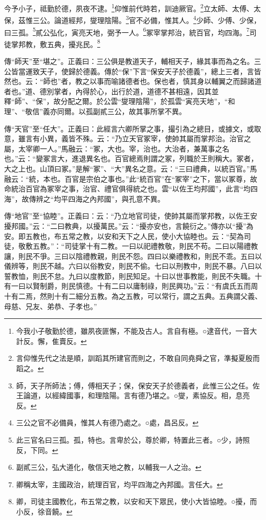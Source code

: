 今予小子，祗勤於德，夙夜不逮。\footnote{今我小子敬勤於德，雖夙夜匪懈，不能及古人。言自有極。○逮音代，一音大計反。懈，隹賣反。}仰惟前代時若，訓迪厥官。\footnote{言仰惟先代之法是順，訓蹈其所建官而則之，不敢自同堯舜之官，準擬夏殷而蹈之。}立太師、太傅、太保，茲惟三公。論道經邦，燮理陰陽。\footnote{師，天子所師法；傅，傅相天子；保，保安天子於德義者，此惟三公之任。佐王論道，以經緯國事，和理陰陽。言有德乃堪之。○燮，素協反。相，息亮反。}官不必備，惟其人。\footnote{三公之官不必備員，惟其人有德乃處之。○處，昌呂反。}少師、少傅、少保，曰三孤。\footnote{此三官名曰三孤。孤，特也。言卑於公，尊於卿，特置此三者。○少，詩照反，下同。}貳公弘化，寅亮天地，弼予一人。\footnote{副貳三公，弘大道化，敬信天地之教，以輔我一人之治。}冢宰掌邦治，統百官，均四海。\footnote{卿稱太宰，主國政治，統理百官，均平四海之內邦國。言任大。}司徒掌邦教，敷五典，擾兆民。\footnote{卿，司徒主國教化，布五常之教，以安和天下眾民，使小大皆協睦。○擾，而小反，徐音饒。}


{\noindent\zhuan{}\fzbyks 傳“師天”至“堪之”。正義曰：三公俱是教道天子，輔相天子，緣其事而為之名。三公皆當運致天子，使歸於德義。傳於“保”下言“保安天子於德義”，總上三者，言皆然也。云：“師也”者，教之以事而喻諸德者也。保也者，慎其身以輔翼之而歸諸道者也。”道、德別掌者，內得於心，出行於道，道德不甚相遠，因其並釋“師”、“保”，故分配之爾。於公雲“燮理陰陽”，於孤雲“寅亮天地”，“和理”、“敬信”義亦同爾。以孤副貳三公，故其事所掌不異。 \par}

{\noindent\zhuan{}\fzbyks 傳“天官”至“任大”。正義曰：此經言六卿所掌之事，撮引為之總目，或據文，或取意，雖言有小異，義皆不殊。云：“乃立天官冢宰，使帥其屬而掌邦治。治官之屬，太宰卿一人。”馬融云：“冢，大也。宰，治也。大治者，兼萬事之名也。”云：“變冢言大，進退異名也。百官總焉則謂之冢，列職於王則稱大。冢者，大之上也。山頂曰冢。”是解“冢”、“大”異名之意。云：“三曰禮典，以統百官。”馬融云：“統，本也。百官是宗伯之事也。”此“統百官”在“冢宰”之下，當以冢尊，故命統治百官為冢宰之事，治官、禮官俱得統之也。雲“以佐王均邦國”，此言“均四海”，故傳辨之“均平四海之內邦國”，與孔意不異。 \par}

{\noindent\zhuan{}\fzbyks 傳“地官”至“協睦”。正義曰：云：“乃立地官司徒，使帥其屬而掌邦教，以佐王安擾邦國。”云：“二曰教典，以擾萬民。”云：“擾亦安也，言饒衍之。”傳亦以“擾”為安。即五教也，布五常之教，以安和天下之人民，使小大協睦也。云：“契為司徒，敬敷五教。”：“司徒掌十有二教。一曰以祀禮教敬，則民不苟。二曰以陽禮教讓，則民不爭。三曰以陰禮教親，則民不怨。四曰以樂禮教和，則民不乖。五曰以儀辨等，則民不越。六曰以俗教安，則民不偷。七曰以刑教中，則民不暴。八曰以誓教恤，則民不怠。九曰以度教節，則民知足。十曰以世事教能，則民不失職。十有一曰以賢制爵，則民慎德。十有二曰以庸制祿，則民興功。”云：“有虞氏五而周十有二焉，然則十有二細分五教。為之五教，可以常行，謂之五典。五典謂父義、母慈、兄友、弟恭、子孝也。” \par}


